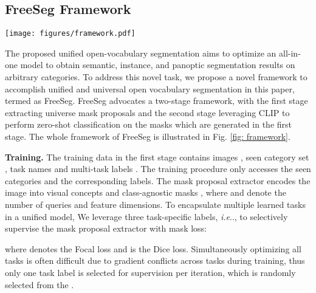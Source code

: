 \documentclass[10pt,twocolumn,letterpaper]{article}
\makeatletter
\DeclareRobustCommand\onedot{\futurelet\@let@token\@onedot}
\def\@onedot{\ifx\@let@token.\else.\null\fi\xspace}
\def\ie{\emph{i.e}\onedot} \def\Ie{\emph{I.e}\onedot}
\makeatother
\begin{document}
\subsection{FreeSeg Framework}

\begin{figure*}[t]
    \centering
    \begin{center}
        \texttt{[image: figures/framework.pdf]}
    \end{center}
        \vspace{-20pt}
    \caption{ Overview of our two-stage FreeSeg framework. 
i) one-shot training: optimizes an all-in-one segmentation model via multi-task supervision to generate universal mask proposals; ii) Multi-task inference: leverages pre-trained CLIP to classify mask proposals according to adaptive task and class prompt.}
    \label{fig: framework}
    \vspace{-5pt}
    \end{figure*}


The proposed unified open-vocabulary segmentation aims to optimize an all-in-one model to obtain semantic, instance, and panoptic segmentation results on arbitrary categories.
To address this novel task,  we propose a novel framework to accomplish unified and universal open vocabulary segmentation in this paper, termed as FreeSeg.
FreeSeg advocates a two-stage framework, with the first stage extracting universe mask proposals and the second stage leveraging CLIP to perform zero-shot classification on the masks which are generated in the first stage. The whole framework of FreeSeg is illustrated in Fig. \ref{fig: framework}.

\textbf{Training.} The training data in the first stage
contains images , seen category set , task names  and multi-task labels . 
The training procedure only accesses the seen categories  and the corresponding labels.
The mask proposal extractor encodes the image into visual concepts  and class-agnostic masks , where  and  denote the number of queries and feature dimensions. 
To encapsulate multiple learned tasks in a unified model, We leverage three task-specific labels, \ie,  to selectively supervise the mask proposal extractor with mask loss:

where  denotes the Focal\cite{lin2017focal} loss and  is the Dice\cite{milletari2016v} loss. 
Simultaneously optimizing all tasks is often difficult due to gradient conflicts across tasks during training, thus only one task label is selected for supervision per iteration, which is randomly selected from the .
\end{document}
